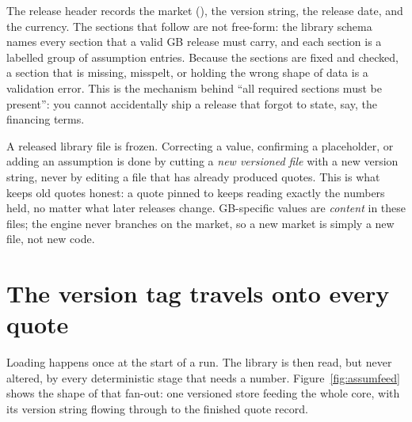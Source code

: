 The release header records the market (), the version string, the release date, and the currency. The sections that follow are not free-form: the library schema names every section that a valid GB release must carry, and each section is a labelled group of assumption entries. Because the sections are fixed and checked, a section that is missing, misspelt, or holding the wrong shape of data is a validation error. This is the mechanism behind ``all required sections must be present'': you cannot accidentally ship a release that forgot to state, say, the financing terms.

\begin{caution}
A released library file is frozen. Correcting a value, confirming a placeholder, or adding an assumption is done by cutting a \emph{new versioned file} with a new version string, never by editing a file that has already produced quotes. This is what keeps old quotes honest: a quote pinned to  keeps reading exactly the numbers  held, no matter what later releases change. GB-specific values are \emph{content} in these files; the engine never branches on the market, so a new market is simply a new file, not new code.
\end{caution}

\section{The version tag travels onto every quote}

Loading happens once at the start of a run. The library is then read, but never altered, by every deterministic stage that needs a number. Figure~\ref{fig:assumfeed} shows the shape of that fan-out: one versioned store feeding the whole core, with its version string flowing through to the finished quote record.

